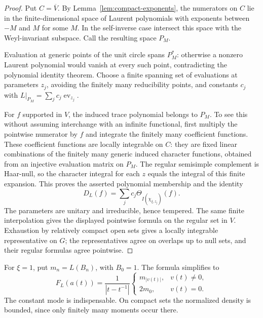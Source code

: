 \begin{proof}
Put $C=\overline V$. By Lemma~\ref{lem:compact-exponents}, the numerators on $C$ lie in the finite-dimensional space of Laurent polynomials with exponents between $-M$ and $M$ for some $M$. In the self-inverse case intersect this space with the Weyl-invariant subspace. Call the resulting space $P_M$.

Evaluation at generic points of the unit circle spans $P_M^*$: otherwise a nonzero Laurent polynomial would vanish at every such point, contradicting the polynomial identity theorem. Choose a finite spanning set of evaluations at parameters $z_j$, avoiding the finitely many reducibility points, and constants $c_j$ with $L|_{P_M}=\sum_j c_j\operatorname{ev}_{z_j}$.

For $f$ supported in $V$, the induced trace polynomial belongs to $P_M$. To see this without assuming interchange with an infinite functional, first multiply the pointwise numerator by $f$ and integrate the finitely many coefficient functions. These coefficient functions are locally integrable on $C$: they are fixed linear combinations of the finitely many generic induced character functions, obtained from an injective evaluation matrix on $P_M$. The regular semisimple complement is Haar-null, so the character integral for each $z$ equals the integral of this finite expansion. This proves the asserted polynomial membership and the identity
\[
D_L(f)=\sum_j c_j\Theta_{I(\chi_{\xi,z_j})}(f).
\]
The parameters are unitary and irreducible, hence tempered. The same finite interpolation gives the displayed pointwise formula on the regular set in $V$. Exhaustion by relatively compact open sets gives a locally integrable representative on $G$; the representatives agree on overlaps up to null sets, and their regular formulas agree pointwise.
\end{proof}

For $\xi=1$, put $m_n=L(B_n)$, with $B_0=1$. The formula simplifies to
\[
F_L(a(t))=\frac{1}{|t-t^{-1}|}
\begin{cases}
m_{|v(t)|},&v(t)\ne0,\\
2m_0,&v(t)=0.
\end{cases}
\]
The constant mode is indispensable. On compact sets the normalized density is bounded, since only finitely many moments occur there.

